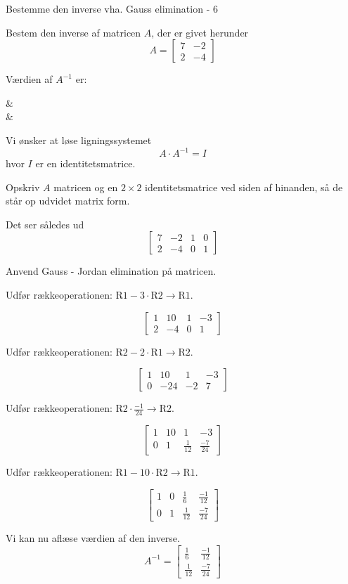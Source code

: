 \documentclass{article}
\begin{document}
\begin{exercise}{Bestemme den inverse vha. Gauss elimination - 6}

Bestem den inverse af matricen $A$, der er givet herunder
\[
A = \left[\begin{array}{cc}
7 & -2 \\
2 & -4
\end{array} \right]
\]

Værdien af $A^{-1}$ er:
\begin{answermatrix}
 &  \\
 & 
\end{answermatrix}

\hint
Vi ønsker at løse ligningssystemet
\[
A \cdot A^{-1} = I
\]
hvor $I$ er en identitetsmatrice.

\hint
Opskriv $A$ matricen og en $2 \times 2$ identitetsmatrice
ved siden af hinanden, så de står op udvidet matrix form.

\hint
Det ser således ud
\[
\left[\begin{array}{cc|cc}
7 & -2 & 1 & 0 \\
2 & -4 & 0 & 1
\end{array} \right]
\]

\hint
Anvend Gauss - Jordan elimination på matricen.

\hint
Udfør rækkeoperationen: $\text{R1} - 3 \cdot \text{R2} \to \text{R1}$.

\hint
\[
\left[\begin{array}{cc|cc}
1 & 10 & 1 & -3 \\
2 & -4 & 0 & 1
\end{array} \right]
\]

\hint
Udfør rækkeoperationen: $\text{R2} - 2 \cdot \text{R1} \to \text{R2}$.

\hint
\[
\left[\begin{array}{cc|cc}
1 & 10 & 1 & -3 \\
0 & -24 & -2 & 7
\end{array} \right]
\]

\hint
Udfør rækkeoperationen: $\text{R2} \cdot \frac{-1}{24} \to \text{R2}$.

\hint
\[
\left[\begin{array}{cc|cc}
1 & 10 & 1 & -3 \\
0 & 1 & \frac{1}{12} & \frac{-7}{24}
\end{array} \right]
\]

\hint
Udfør rækkeoperationen: $\text{R1} - 10 \cdot \text{R2} \to \text{R1}$.

\hint
\[
\left[\begin{array}{cc|cc}
1 & 0 & \frac{1}{6} & \frac{-1}{12} \\
0 & 1 & \frac{1}{12} & \frac{-7}{24}
\end{array} \right]
\]

\hint
Vi kan nu aflæse værdien af den inverse.
\[
A^{-1} = \left[\begin{array}{cc}
\frac{1}{6} & \frac{-1}{12} \\
\frac{1}{12} & \frac{-7}{24}
\end{array} \right]
\]


\end{exercise}
\end{document}

